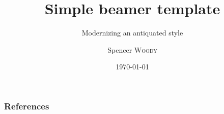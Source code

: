 




\title[Beamer template]{Simple beamer template}
\subtitle{Modernizing an antiquated style}


\author{Spencer \textsc{Woody}}






\date{\today} 
















\begin{frame}[t,allowframebreaks]
\frametitle{References}

\footnotesize
\begingroup
\renewcommand{\section}[2]{}

\endgroup
\normalsize

\end{frame}




